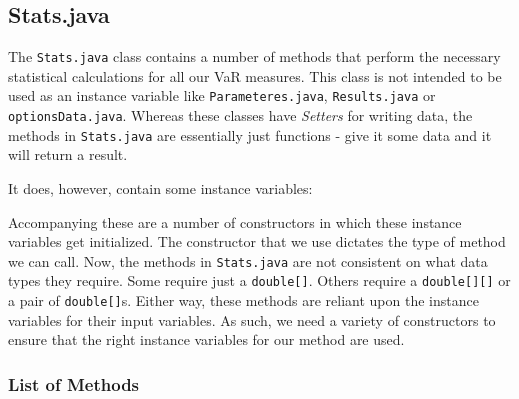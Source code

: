 \documentclass[../Dissertation.tex]{subfiles}
\begin{document}
\subsection{Stats.java}
\label{section:stats}
The \lstinline|Stats.java| class contains a number of methods that perform the necessary statistical calculations for all our VaR measures.
This class is not intended to be used as an instance variable like \lstinline|Parameteres.java|, \lstinline|Results.java| or \lstinline|optionsData.java|.
Whereas these classes have \textit{Setters} for writing data, the methods in \lstinline|Stats.java| are essentially just functions - give it some data and it will return a result.

It does, however, contain some instance variables:

Accompanying these are a number of constructors in which these instance variables get initialized.
The constructor that we use dictates the type of method we can call.
Now, the methods in \lstinline|Stats.java| are not consistent on what data types they require.
Some require just a \lstinline|double[]|. 
Others require a \lstinline|double[][]| or a pair of \lstinline|double[]|s.
Either way, these methods are reliant upon the instance variables for their input variables.
As such, we need a variety of constructors to ensure that the right instance variables for our method are used.

\subsubsection{List of Methods}
\end{document}
